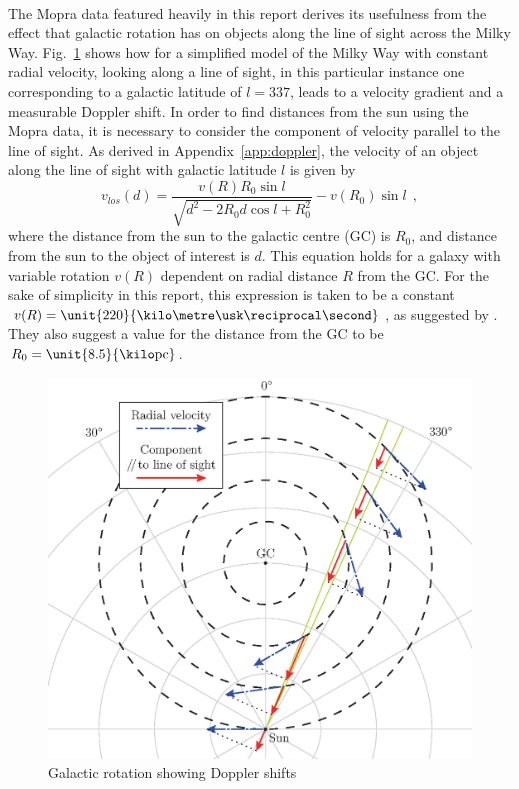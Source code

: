 \documentclass[a4paper, titlepage, oneside]{article}
\newcommand{\parsec}{\mathrm{pc}}
\begin{document}
\begin{multicols}{2}
\paragraph{}
The Mopra data featured heavily in this report \parencite{Burton:2013} derives its usefulness from the effect that galactic rotation has on objects along the line of sight across the Milky Way. Fig.~\ref{fig:gal-rot} shows how for a simplified model of the Milky Way with constant radial velocity, looking along a line of sight, in this particular instance one corresponding to a galactic latitude of \(l=337\), leads to a velocity gradient and a measurable Doppler shift. In order to find distances from the sun using the Mopra data, it is necessary to consider the component of velocity parallel to the line of sight. As derived in Appendix~\ref{app:doppler}, the velocity of an object along the line of sight with galactic latitude \(l\) is given by
\begin{equation}
  v_{los}(d)=\frac{v(R)R_0\sin{l}}{\sqrt{d^2-2R_0d\cos{l}+R_0^2}}-v(R_0)\sin{l}\;\,,
\end{equation}
where the distance from the sun to the galactic centre (GC) is \(R_0\), and distance from the sun to the object of interest is \(d\). This equation holds for a galaxy with variable rotation \(v(R)\) dependent on radial distance \(R\) from the GC. For the sake of simplicity in this report, this expression is taken to be a constant \(v(R)=\unit{220}{\kilo\metre\usk\reciprocal\second}\), as suggested by \textcite{Kerr:1986}. They also suggest a value for the distance from the GC to be \(R_0=\unit{8.5}{\kilo\parsec}\).

\begin{figure}[H]
  \centering
  \includegraphics[width = \columnwidth]{figures/galactic-rotation}
  \caption{Galactic rotation showing Doppler shifts}
  \label{fig:gal-rot}
\end{figure}


\end{multicols}
\end{document}
